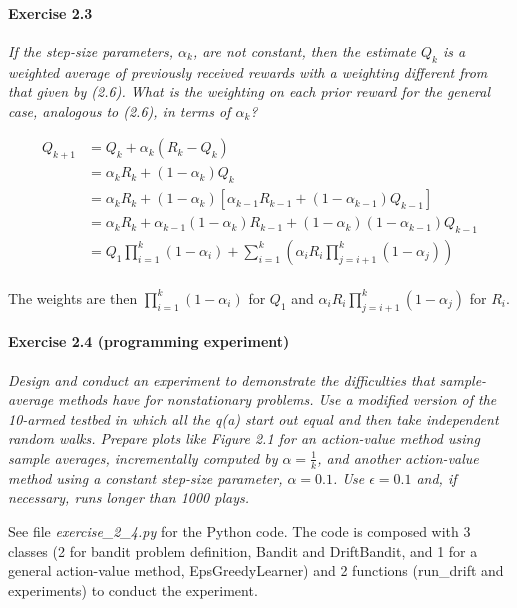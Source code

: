 \paragraph{Exercise 2.3}
\textit{If the step-size parameters, $\alpha_k$, are not constant, then the estimate $Q_k$ is a weighted average of previously received rewards with a weighting different from that given by (2.6). What is the weighting on each prior reward for the general case, analogous to (2.6), in terms of $\alpha_k$?}

\begin{align*}
Q_{k+1} &= Q_k + \alpha_k (R_k - Q_k) \\
        &= \alpha_k R_k + (1 - \alpha_k) Q_k \\
        &= \alpha_k R_k + (1 - \alpha_k) [\alpha_{k-1} R_{k-1} + (1 - \alpha_{k-1}) Q_{k-1}] \\
        &= \alpha_k R_k + \alpha_{k-1} (1 - \alpha_k) R_{k-1} + (1 - \alpha_{k}) (1 - \alpha_{k-1}) Q_{k-1} \\
        &= Q_1 \prod_{i=1}^k (1 - \alpha_i)  + \sum_{i=1}^k \left( \alpha_i R_i \prod_{j=i+1}^{k} (1 - \alpha_j)  \right) \\
\end{align*}

The weights are then $\prod_{i=1}^k (1 - \alpha_i)$ for $Q_1$ and $\alpha_i R_i \prod_{j=i+1}^{k} (1 - \alpha_j)$ for $R_i$.

\paragraph{Exercise 2.4 (programming experiment)}
\textit{Design and conduct an experiment to demonstrate the difficulties that sample-average methods have for nonstationary problems. Use a modified version of the 10-armed testbed in which all the q(a) start out equal and then take independent random walks. Prepare plots like Figure 2.1 for an action-value method using sample averages, incrementally computed by $\alpha = \frac{1}{k}$, and another action-value method using a constant step-size parameter, $\alpha = 0.1$. Use $\epsilon = 0.1$ and, if necessary, runs longer than 1000 plays.}

See file \textit{exercise\_2\_4.py} for the Python code.
The code is composed with 3 classes (2 for bandit problem definition, Bandit and DriftBandit, and 1 for a general action-value method, EpsGreedyLearner) and 2 functions (run\_drift and experiments) to conduct the experiment.

